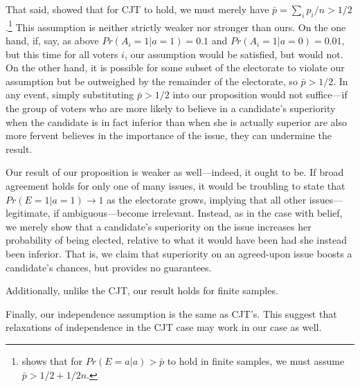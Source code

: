 \documentclass[11pt]{article}
\begin{document}
That said, \citet{dietrich2008premises} showed that for CJT to
hold, we must merely have $\bar{p}=\sum_i
p_i/n>1/2$.\footnote{\citet{boland1989majority} shows that for
  $Pr(E=a|a)>\bar{p}$ to hold in finite samples, we must assume $\bar{p}>1/2 +1/2n$.}
This assumption is neither strictly weaker nor stronger than ours.
On the one hand, if, say, as above
$Pr(A_i=1|a=1)=0.1$ and $Pr(A_i=1|a=0)=0.01$, but this time for all
voters $i$, our assumption would be satisfied, but
\citet{dietrich2008premises} would not.
On the other hand, it is possible for some subset of the electorate to
violate our assumption but be outweighed by the remainder of the
electorate, so $\bar{p}>1/2$.
In any event, simply substituting $\bar{p}>1/2$ into our proposition
would not suffice---if the group of voters who are more likely to
believe in a candidate's superiority when the candidate is in fact
inferior than when she is actually superior are also more fervent
believes in the importance of the issue, they can undermine the
result.

Our result of our proposition is weaker as well---indeed, it ought to be.
If broad agreement holds for only one of many issues, it would be
troubling to state that $Pr(E=1|a=1)\rightarrow 1$ as the electorate
grows, implying that all other issues---legitimate, if
ambiguous---become irrelevant.
Instead, as in the case with belief, we merely show that a candidate's
superiority on the issue increases her probability of being elected,
relative to what it would have been had she instead been inferior.
That is, we claim that superiority on an agreed-upon issue boosts a
candidate's chances, but provides no guarantees.

Additionally, unlike the CJT, our result holds for finite samples.

Finally, our independence assumption is the same as CJT's.
This suggest that relaxations of independence in the CJT case
\citep[e.g.]{boland1989modelling} may work in our case as well.
\end{document}
